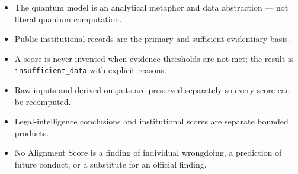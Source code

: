 \begin{itemize}
  \item The quantum model is an analytical metaphor and data abstraction ---
        not literal quantum computation.
  \item Public institutional records are the primary and sufficient
        evidentiary basis.
  \item A score is never invented when evidence thresholds are not met; the
        result is \texttt{insufficient\_data} with explicit reasons.
  \item Raw inputs and derived outputs are preserved separately so every
        score can be recomputed.
  \item Legal-intelligence conclusions and institutional scores are separate
        bounded products.
  \item No Alignment Score is a finding of individual wrongdoing, a prediction
        of future conduct, or a substitute for an official finding.
\end{itemize}
